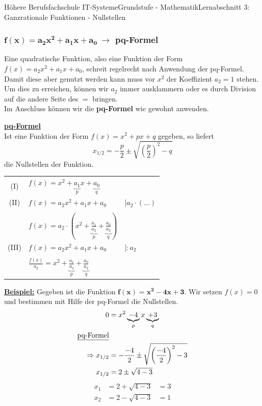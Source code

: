 \documentclass[11pt,twocolumn,oneside,openany,headings=optiontotoc,11pt,numbers=noenddot]{article}
\begin{document}
\begin{worksheet}{Höhere Berufsfachschule IT-Systeme}{Grundstufe - Mathematik}{Lernabschnitt 3: Ganzrationale Funktionen - Nullstellen}
		\subsubsection{\(\mathbf{f(x) = a_2x^2+a_1x+a_0}\ \rightarrow\) pq-Formel}
		Eine quadratische Funktion, also eine Funktion der Form \(f(x) = a_2x^2+a_1x+a_0\), schreit regelrecht nach Anwendung der pq-Formel.\\
		Damit diese aber genutzt werden kann muss vor \(x^2\) der Koeffizient \(a_2 = 1\) stehen.\\
		Um dies zu erreichen, können wir \(a_2\) immer ausklammern oder es durch Division auf die andere Seite des \(=\) bringen.\\
		Im Anschluss können wir die \textbf{pq-Formel} wie gewohnt anwenden.\\
		\begin{framed}
			\noindent
			\underline{\textbf{pq-Formel}}\\
			Ist eine Funktion der Form \(f(x) = x^2 + px + q\) gegeben, so liefert \[x_{1/2} = -\frac{p}{2}\pm \sqrt{\left(\frac{p}{2}\right)^2 - q}\] die Nullstellen der Funktion.
		\end{framed}
	 	\par\noindent
	 	\begin{tabularx}{0.48\textwidth}{cXl}
	 		(I) & \(f(x) = x^2 + \underbrace{a_1}_{p}x + \underbrace{a_0}_{q}\) &\\
	 		(II) & \(f(x) = a_2x^2 + a_1x + a_0\) & |\(a_2\cdot(\ldots)\)\\
	 		\\
	 		& \(f(x) = a_2\cdot(x^2 + \underbrace{\frac{a_1}{a_2}}_{p} + \underbrace{\frac{a_0}{a_2}}_{q})\)\\
	 		(III) & \(f(x) = a_2x^2 + a_1x + a_0\) & |\(:a_2\)\\
	 		\\
	 		& \(\frac{f(x)}{a_2} = x^2 + \underbrace{\frac{a_1}{a_2}}_{p} + \underbrace{\frac{a_0}{a_2}}_{q}\) & \\
	 	\end{tabularx}
		\noindent
		\underline{\textbf{Beispiel:}} Gegeben ist die Funktion \(\mathbf{f(x) = x^2 -4x + 3}\). Wir setzen \(f(x) = 0\) und bestimmen mit Hilfe der pq-Formel die Nullstellen.
		\begin{align*}
			0 & = x^2 \underbrace{- 4}_{p}x \underbrace{+ 3}_{q}\\
			\text{\underline{pq-Formel}}\\
			\Rightarrow x_{1/2} & = -\frac{-4}{2} \pm \sqrt{\left(\frac{-4}{2}\right)^2 - 3}\\
			x_{1/2} & = 2 \pm \sqrt{4 - 3}\\
		\end{align*}
		\begin{align*}
			x_1 & = 2 + \sqrt{4 - 3} & = 3\\
			x_2 & = 2 - \sqrt{4 - 3} & = 1\\\\
		\end{align*}

\end{worksheet}
\end{document}
